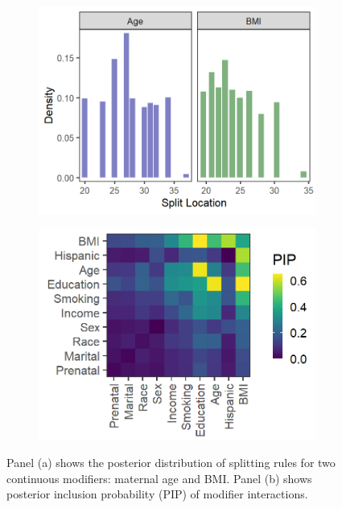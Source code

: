 \documentclass[12pt]{article}
\begin{document}
\begin{figure}
    \centering
    \begin{subfigure}{.46\textwidth}
        \includegraphics[width=.95\textwidth]{supp-img/bwgaz_cont_split.png}
        \caption{}
        \label{fig:pip-cont}
    \end{subfigure}
    \begin{subfigure}{.45\textwidth}
        \includegraphics[width=.95\textwidth]{supp-img/bwgaz_pip_int.png}
        \caption{}
        \label{fig:pip-int}
    \end{subfigure}
    \caption{Panel (a) shows the posterior distribution of splitting rules for two continuous modifiers: maternal age and BMI. Panel (b) shows posterior inclusion probability (PIP) of modifier interactions.}
    \label{fig:pip}
\end{figure}
\end{document}
